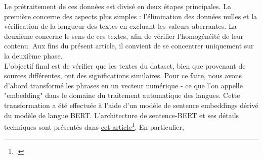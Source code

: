 Le prétraitement de ces données est divisé en deux étapes principales. La première concerne des aspects plus simples : l'élimination des données nulles et la vérification de la longueur des textes en excluant les valeurs aberrantes. La deuxième concerne le sens de ces textes, afin de vérifier l'homogénéité de leur contenu. Aux fins du présent article, il convient de se concentrer uniquement sur la deuxième phase.
\\

L'objectif final est de vérifier que les textes du dataset, bien que provenant de sources différentes, ont des significations similaires. Pour ce faire, nous avons d'abord transformé les phrases en un vecteur numérique - ce que l'on appelle "embedding" dans le domaine du traitement automatique des langues. Cette transformation a été effectuée à l'aide d'un modèle de sentence embeddings dérivé du modèle de langue BERT. L'architecture de sentence-BERT et ses détails techniques sont présentés dans {\color{red} \href{https://arxiv.org/abs/1908.10084}{cet article}}\footcite{reimers2019}.  
En particulier,